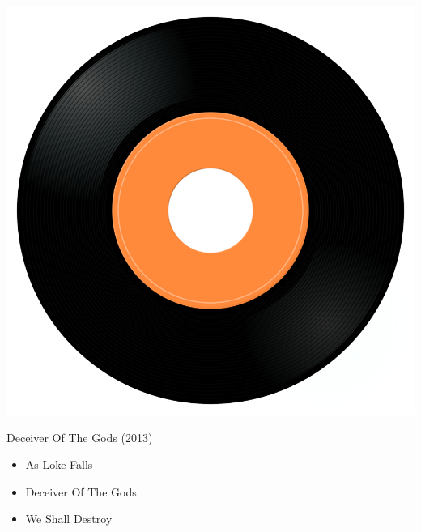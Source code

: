\begin{minipage}[t]{0.25\textwidth}\vspace{0pt}
\captionsetup{type=figure}
\includegraphics[width=\textwidth]{Images/cover.png}
\caption*{Deceiver Of The Gods (2013)}
\end{minipage}
\begin{minipage}[t]{0.25\textwidth}\vspace{0pt}
\begin{itemize}[nosep,leftmargin=1em,labelwidth=*,align=left]
	\setlength{\itemsep}{0pt}
	\item As Loke Falls
	\item Deceiver Of The Gods
	\item We Shall Destroy
\end{itemize}
\end{minipage}
